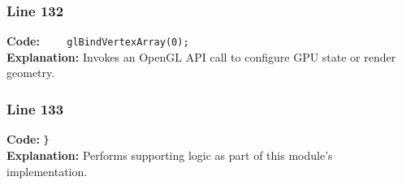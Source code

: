 \documentclass[11pt,a4paper]{article}
\begin{document}
\subsubsection*{Line 132}
\textbf{Code:} \verb|    glBindVertexArray(0);|\\
\textbf{Explanation:} Invokes an OpenGL API call to configure GPU state or render geometry.

\subsubsection*{Line 133}
\textbf{Code:} \verb|}|\\
\textbf{Explanation:} Performs supporting logic as part of this module's implementation.
\end{document}
